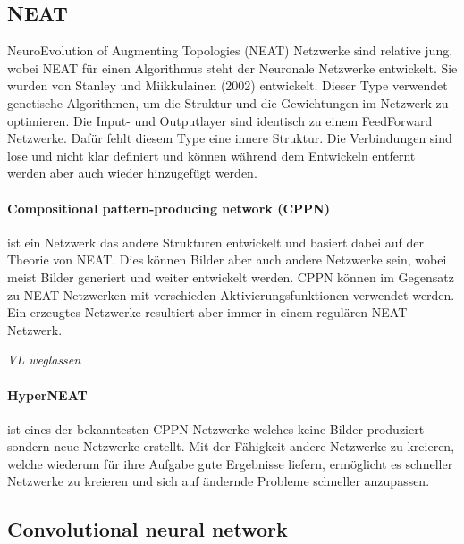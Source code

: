 \subsection{NEAT}

NeuroEvolution of Augmenting Topologies (NEAT) Netzwerke sind relative jung, wobei NEAT für einen Algorithmus steht der Neuronale Netzwerke entwickelt.
Sie wurden von Stanley und Miikkulainen (2002) entwickelt. 
Dieser Type verwendet genetische Algorithmen, um die Struktur und die Gewichtungen im Netzwerk zu optimieren.
Die Input- und Outputlayer sind identisch zu einem FeedForward Netzwerke.
Dafür fehlt diesem Type eine innere Struktur. 
Die Verbindungen sind lose und nicht klar definiert und können während dem Entwickeln entfernt werden aber auch wieder hinzugefügt werden.


\paragraph{Compositional pattern-producing network (CPPN)} ist ein Netzwerk das andere Strukturen entwickelt und basiert dabei auf der Theorie von NEAT. 
Dies können Bilder aber auch andere Netzwerke sein, wobei meist Bilder generiert und weiter entwickelt werden.
CPPN können im Gegensatz zu NEAT Netzwerken mit verschieden Aktivierungsfunktionen verwendet werden.
Ein erzeugtes Netzwerke resultiert aber immer in einem regulären NEAT Netzwerk.


\textit{VL weglassen} 
\paragraph{HyperNEAT} ist eines der bekanntesten CPPN Netzwerke welches keine Bilder produziert sondern neue Netzwerke erstellt.
Mit der Fähigkeit andere Netzwerke zu kreieren, welche wiederum für ihre Aufgabe gute Ergebnisse liefern, ermöglicht es schneller Netzwerke zu kreieren und sich auf ändernde Probleme schneller anzupassen.

\subsection{Convolutional neural network}

